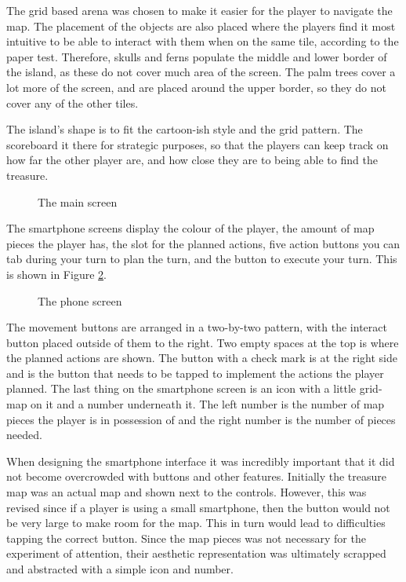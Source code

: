 The grid based arena was chosen to make it easier for the player to navigate the map. The placement of the objects are also placed where the players find it most intuitive to be able to interact with them when on the same tile, according to the paper test. Therefore, skulls and ferns populate the middle and lower border of the island, as these do not cover much area of the screen. The palm trees cover a lot more of the screen, and are placed around the upper border, so they do not cover any of the other tiles.

The island's shape is to fit the cartoon-ish style and the grid pattern. The scoreboard it there for strategic purposes, so that the players can keep track on how far the other player are, and how close they are to being able to find the treasure. 

\begin{figure}
	\centering
	\caption{The main screen}\label{fig:main_screen}
\end{figure}

The smartphone screens display the colour of the player, the amount of map pieces the player has, the slot for the planned actions, five action buttons you can tab during your turn to plan the turn, and the button to execute your turn. This is shown in Figure \ref{fig:phone_screen}.

\begin{figure}
	\centering
	\caption{The phone screen}\label{fig:phone_screen}
\end{figure}

The movement buttons are arranged in a two-by-two pattern, with the interact button placed outside of them to the right. Two empty spaces at the top is where the planned actions are shown. The button with a check mark is at the right side and is the button that needs to be tapped to implement the actions the player planned. The last thing on the smartphone screen is an icon with a little grid-map on it and a number underneath it. The left number is the number of map pieces the player is in possession of and the right number is the number of pieces needed. 

When designing the smartphone interface it was incredibly important that it did not become overcrowded with buttons and other features. Initially the treasure map was an actual map and shown next to the controls. However, this was revised since if a player is using a small smartphone, then the button would not be very large to make room for the map. This in turn would lead to difficulties tapping the correct button. Since the map pieces was not necessary for the experiment of attention, their aesthetic representation was ultimately scrapped and abstracted with a simple icon and number.

